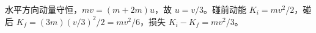 水平方向动量守恒，$mv=(m+2m)u$，故 $u=v/3$。碰前动能 $K_i=mv^2/2$，碰后 $K_f=(3m)(v/3)^2/2=mv^2/6$，损失 $K_i-K_f=mv^2/3$。
